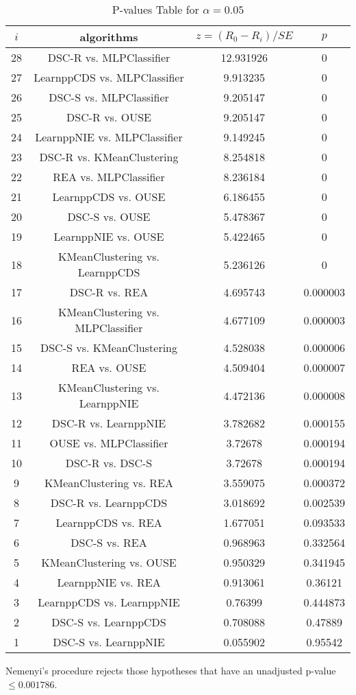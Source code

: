 \documentclass[a4paper,10pt]{article}
\begin{document}
\begin{landscape}
\begin{table}[!htp]
\centering\scriptsize
\begin{tabular}{cccc}
$i$&algorithms&$z=(R_0 - R_i)/SE$&$p$\\
\hline28&DSC-R vs. MLPClassifier&12.931926&0\\
27&LearnppCDS vs. MLPClassifier&9.913235&0\\
26&DSC-S vs. MLPClassifier&9.205147&0\\
25&DSC-R vs. OUSE&9.205147&0\\
24&LearnppNIE vs. MLPClassifier&9.149245&0\\
23&DSC-R vs. KMeanClustering&8.254818&0\\
22&REA vs. MLPClassifier&8.236184&0\\
21&LearnppCDS vs. OUSE&6.186455&0\\
20&DSC-S vs. OUSE&5.478367&0\\
19&LearnppNIE vs. OUSE&5.422465&0\\
18&KMeanClustering vs. LearnppCDS&5.236126&0\\
17&DSC-R vs. REA&4.695743&0.000003\\
16&KMeanClustering vs. MLPClassifier&4.677109&0.000003\\
15&DSC-S vs. KMeanClustering&4.528038&0.000006\\
14&REA vs. OUSE&4.509404&0.000007\\
13&KMeanClustering vs. LearnppNIE&4.472136&0.000008\\
12&DSC-R vs. LearnppNIE&3.782682&0.000155\\
11&OUSE vs. MLPClassifier&3.72678&0.000194\\
10&DSC-R vs. DSC-S&3.72678&0.000194\\
9&KMeanClustering vs. REA&3.559075&0.000372\\
8&DSC-R vs. LearnppCDS&3.018692&0.002539\\
7&LearnppCDS vs. REA&1.677051&0.093533\\
6&DSC-S vs. REA&0.968963&0.332564\\
5&KMeanClustering vs. OUSE&0.950329&0.341945\\
4&LearnppNIE vs. REA&0.913061&0.36121\\
3&LearnppCDS vs. LearnppNIE&0.76399&0.444873\\
2&DSC-S vs. LearnppCDS&0.708088&0.47889\\
1&DSC-S vs. LearnppNIE&0.055902&0.95542\\
\hline
\end{tabular}
\caption{P-values Table for $\alpha=0.05$}
\end{table}Nemenyi's procedure rejects those hypotheses that have an unadjusted p-value $\le0.001786$.


\end{landscape}
\end{document}
